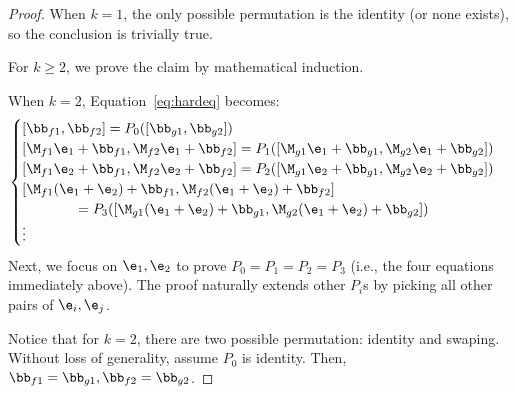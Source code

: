 \begin{proof}
    When $k=1$,
    the only possible permutation is the identity (or none exists),
    so the conclusion is trivially true.

    For $k\ge 2$, we prove the claim by mathematical induction.

    When $k=2$, Equation~\ref{eq:hardeq} becomes:
    \begin{align}
        \begin{cases}
            [\bb_{f1}, \bb_{f2}] = P_0([\bb_{g1},\bb_{g2}])\\
            [\M_{f1} \e_1 + \bb_{f1},\M_{f2} \e_1 + \bb_{f2}] = P_1([\M_{g1} \e_1 + \bb_{g1}, \M_{g2} \e_1 + \bb_{g2}])\\
            [\M_{f1} \e_2 + \bb_{f1},\M_{f2} \e_2 + \bb_{f2}] = P_2([\M_{g1} \e_2 + \bb_{g1}, \M_{g2} \e_2 + \bb_{g2}])\\
            [\M_{f1} (\e_1+\e_2) + \bb_{f1},\M_{f2} (\e_1+\e_2) + \bb_{f2}] \\
            \quad\quad\quad\quad= P_3([\M_{g1} (\e_1+\e_2) + \bb_{g1}, \M_{g2} (\e_1+\e_2) + \bb_{g2}])\\
            \vdots\\
        \end{cases}
        \label{eq:keq2}
    \end{align}
    Next, we focus on $\e_1,\e_2$ to prove $P_0=P_1=P_2=P_3$ (i.e., the four equations immediately above).
    The proof naturally extends other $P_i$s by picking all other pairs of $\e_i,\e_j$.

    Notice that for $k=2$, there are two possible permutation: identity and swaping.
    Without loss of generality, assume $P_0$ is identity.
    Then, $\bb_{f1}=\bb_{g1}, \bb_{f2}=\bb_{g2}$.


\end{proof}
